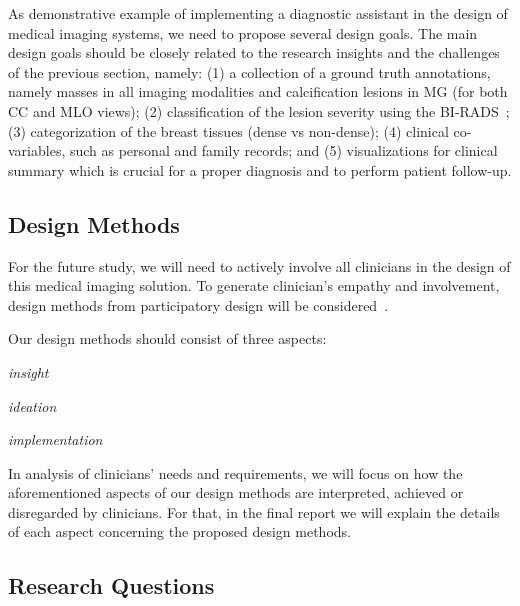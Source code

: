 As demonstrative example of implementing a diagnostic assistant in the design of medical imaging systems, we need to propose several design goals.
The main design goals should be closely related to the research insights and the challenges of the previous section, namely:
(1) a collection of a ground truth annotations, namely masses in all imaging modalities and calcification lesions in MG (for both CC and MLO views);
(2) classification of the lesion severity using the BI-RADS~\cite{aghaei2018association};
(3) categorization of the breast tissues (dense vs non-dense);
(4) clinical co-variables, such as personal and family records; and
(5) visualizations for clinical summary which is crucial for a proper diagnosis and to perform patient follow-up.

\subsection{Design Methods}
\label{sec:sec00304}

For the future study, we will need to actively involve all clinicians in the design of this medical imaging solution.
To generate clinician's empathy and involvement, design methods from participatory design will be considered~\cite{10.1145/3025453.3025873}.

\break

\noindent
Our design methods should consist of three aspects:

\begin{itemize}
\begin{minipage}{0.3\linewidth}
\item {\it insight}
\end{minipage}
\begin{minipage}{0.3\linewidth}
\item {\it ideation}
\end{minipage}
\begin{minipage}{0.3\linewidth}
\item {\it implementation}
\end{minipage}
\end{itemize}

\hfill

In analysis of clinicians' needs and requirements, we will focus on how the aforementioned aspects of our design methods are interpreted, achieved or disregarded by clinicians.
For that, in the final report we will explain the details of each aspect concerning the proposed design methods.

\subsection{Research Questions}
\label{sec:sec00305}

